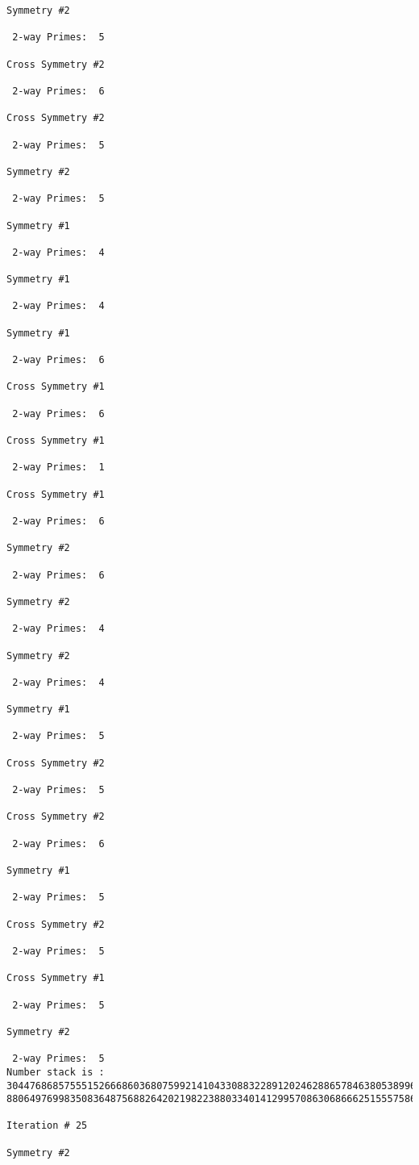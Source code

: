 {{{{\begin{verbatim}
Symmetry #2

 2-way Primes: 	5

Cross Symmetry #2

 2-way Primes: 	6

Cross Symmetry #2

 2-way Primes: 	5

Symmetry #2

 2-way Primes: 	5

Symmetry #1

 2-way Primes: 	4

Symmetry #1

 2-way Primes: 	4

Symmetry #1

 2-way Primes: 	6

Cross Symmetry #1

 2-way Primes: 	6

Cross Symmetry #1

 2-way Primes: 	1

Cross Symmetry #1

 2-way Primes: 	6

Symmetry #2

 2-way Primes: 	6

Symmetry #2

 2-way Primes: 	4

Symmetry #2

 2-way Primes: 	4

Symmetry #1

 2-way Primes: 	5

Cross Symmetry #2

 2-way Primes: 	5

Cross Symmetry #2

 2-way Primes: 	6

Symmetry #1

 2-way Primes: 	5

Cross Symmetry #2

 2-way Primes: 	5

Cross Symmetry #1

 2-way Primes: 	5

Symmetry #2

 2-way Primes: 	5
Number stack is :
30447686857555152666860368075992141043308832289120246288657846380538996794608835958544046240163340857
88064976998350836487568826420219822388033401412995708630686662515557586867440375804336104264044585953

Iteration #	25

Symmetry #2


\end{verbatim}}}}}
